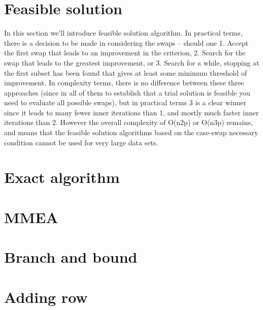 \section{Feasible solution} \label{section_feasible_solution}
In this section we'll introduce feasible solution algorithm. 
In practical terms,
there is a decision to be made in considering the swaps – should one
1. Accept the first swap that leads to an improvement in the criterion,
2. Search for the swap that leads to the greatest improvement, or
3. Search for a while, stopping at the first subset has been found that gives at least
some minimum threshold of improvement.
In complexity terms, there is no difference between these three approaches (since in
all of them to establish that a trial solution is feasible you need to evaluate all possible
swaps), but in practical terms 3 is a clear winner since it leads to many fewer inner
iterations than 1, and mostly much faster inner iterations than 2. However the overall
complexity of O(n2p) or O(n3p) remains, and means that the feasible solution algorithms
based on the case-swap necessary condition cannot be used for very large data sets.


\section{Exact algorithm}

\section{MMEA}
\section{Branch and bound}
\section{Adding row}
